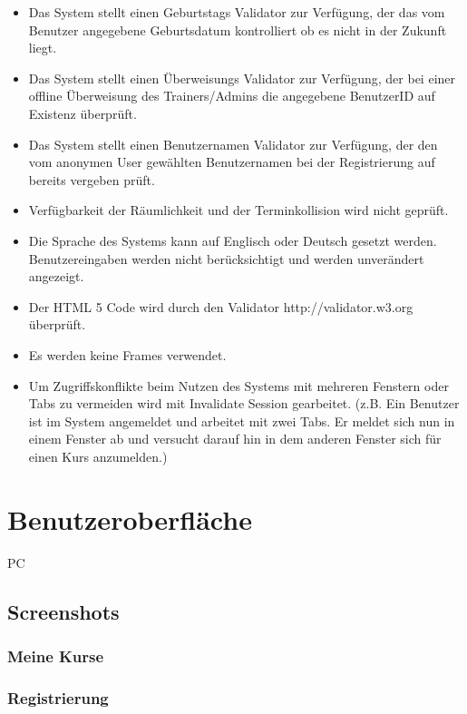 \documentclass[a4paper]{scrreprt}
\begin{document}
\begin{itemize}
	\item \Func{} Das System stellt einen Geburtstags Validator zur Verfügung, der das vom Benutzer angegebene Geburtsdatum kontrolliert ob es nicht in der Zukunft liegt. 
	\item \Func{} Das System stellt einen Überweisungs Validator zur Verfügung, der bei einer offline Überweisung des Trainers/Admins die angegebene BenutzerID auf Existenz überprüft.
	\item \Func{} Das System stellt einen Benutzernamen Validator zur Verfügung, der den vom anonymen User gewählten Benutzernamen bei der Registrierung auf bereits vergeben prüft.   
	\item \Func{} Verfügbarkeit der Räumlichkeit und der Terminkollision wird nicht geprüft.
	\item \Func{} Die Sprache des Systems kann auf Englisch oder Deutsch gesetzt werden. Benutzereingaben werden nicht berücksichtigt und werden unverändert angezeigt.
	\item \Func{} Der HTML 5 Code wird durch den Validator http://validator.w3.org überprüft.
	\item \Func{} Es werden keine Frames verwendet.
	\item \Func{} Um Zugriffskonflikte beim Nutzen des Systems mit mehreren Fenstern oder Tabs zu vermeiden wird mit Invalidate Session gearbeitet. (z.B. Ein Benutzer ist im System angemeldet und arbeitet mit zwei Tabs. Er meldet sich nun in einem Fenster ab und versucht darauf hin in dem anderen Fenster sich für einen Kurs anzumelden.)  
\end{itemize}

		
		
 
\chapter{Benutzeroberfläche}
	\begin{tiny}
		PC
	\end{tiny}
   
    \section{Screenshots}
    
	    \subsection{Meine Kurse}
    	
	    \subsection{Registrierung}
		    
\end{document}

